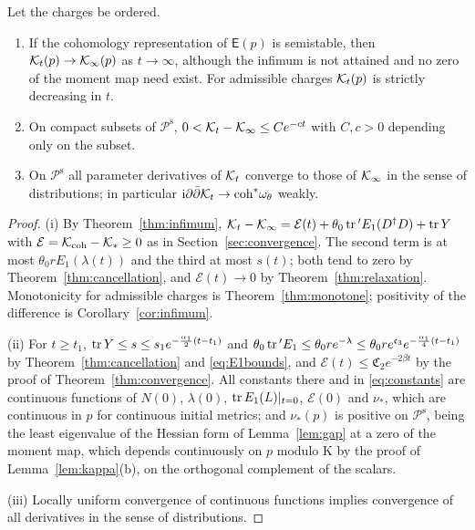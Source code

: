 \begin{theorem}\label{thm:families}
Let the charges be ordered.
\begin{enumerate}
\item[(i)] If the cohomology representation of $\mathsf E(p)$ is semistable,
 then $\mathcal K_t(p)\to\mathcal K_\infty(p)$ as $t\to\infty$, although the infimum is not
 attained and no zero of the moment map need exist. For admissible charges
 $\mathcal K_t(p)$ is strictly decreasing in $t$.
\item[(ii)] On compact subsets of $\mathcal P^{\mathrm s}$,
 $0<\mathcal K_t-\mathcal K_\infty\leq Ce^{-ct}$ with $C,c>0$ depending only on the subset.
\item[(iii)] On $\mathcal P^{\mathrm s}$ all parameter derivatives of $\mathcal K_t$
 converge to those of $\mathcal K_\infty$ in the sense of distributions; in
 particular $\mathrm i\partial\bar\partial\mathcal K_t\to\mathrm{coh}^*\omega_\theta$
 weakly.
\end{enumerate}
\end{theorem}

\begin{proof}
(i) By Theorem~\ref{thm:infimum},
$\mathcal K_t-\mathcal K_\infty=\mathcal E(t)+\theta_0\operatorname{tr}{}'E_1(D^\dagger D)+\operatorname{tr} Y$ with
$\mathcal E=\mathcal K_{\mathrm{coh}}-\mathcal K_*\geq0$ as in Section~\ref{sec:convergence}. The
second term is at most $\theta_0rE_1(\lambda(t))$ and the third at most
$s(t)$; both tend to zero by
Theorem~\ref{thm:cancellation}, and $\mathcal E(t)\to0$ by
Theorem~\ref{thm:relaxation}. Monotonicity for admissible charges is
Theorem~\ref{thm:monotone}; positivity of the difference is
Corollary~\ref{cor:infimum}.

(ii) For $t\geq t_1$, $\operatorname{tr} Y\leq s\leq s_1e^{-\frac{\alpha_1}2(t-t_1)}$ and
$\theta_0\operatorname{tr}{}'E_1\leq\theta_0re^{-\lambda}\leq\theta_0re^{\mathfrak c_3}e^{-\frac{\alpha_1}4(t-t_1)}$
by Theorem~\ref{thm:cancellation} and \eqref{eq:E1bounds}, and
$\mathcal E(t)\leq\mathfrak C_2e^{-2\beta t}$ by the proof of
Theorem~\ref{thm:convergence}. All constants there and in
\eqref{eq:constants} are continuous functions of $N(0)$, $\lambda(0)$,
$\operatorname{tr} E_1(L)|_{t=0}$, $\mathcal E(0)$ and $\nu_*$, which are continuous in $p$
for continuous initial metrics; and $\nu_*(p)$ is positive on
$\mathcal P^{\mathrm s}$, being the least eigenvalue of the Hessian form of
Lemma~\ref{lem:gap} at a zero of the moment map, which depends continuously
on $p$ modulo $\mathrm K$ by the proof of Lemma~\ref{lem:kappa}(b), on the
orthogonal complement of the scalars.

(iii) Locally uniform convergence of continuous functions implies convergence
of all derivatives in the sense of distributions.
\end{proof}

